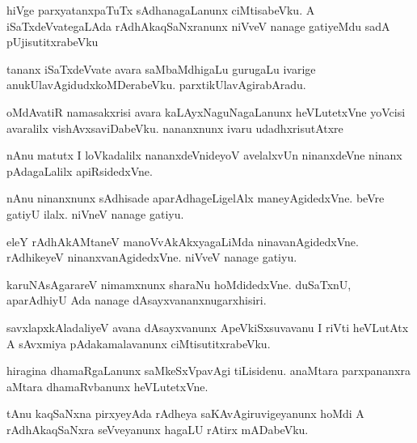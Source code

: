 \documentclass{article}
\begin{document}
\begin{mn}%
hiVge parxyatanxpaTuTx sAdhanagaLanunx ciMtisabeVku. A iSaTxdeVvategaLAda 
rAdhAkaqSaNxranunx niVveV nanage gatiyeMdu sadA pUjisutitxrabeVku
\end{mn}

\begin{mn}%
tananx iSaTxdeVvate avara saMbaMdhigaLu gurugaLu ivarige anukUlavAgidudxkoMDerabeVku. 
parxtikUlavAgirabAradu.
\end{mn}

\begin{mn}%
oMdAvatiR namasakxrisi avara kaLAyxNaguNagaLanunx heVLutetxVne yoVcisi avaralilx 
vishAvxsaviDabeVku. nananxnunx ivaru udadhxrisutAtxre
\end{mn}

\begin{mn}%
nAnu matutx I loVkadalilx nananxdeVnideyoV avelalxvUn ninanxdeVne ninanx pAdagaLalilx 
apiRsidedxVne.
\end{mn}

\begin{mn}%
nAnu ninanxnunx sAdhisade aparAdhageLigelAlx maneyAgidedxVne. beVre gatiyU ilalx. niVneV 
nanage gatiyu.
\end{mn}

\begin{mn}%
eleY rAdhAkAMtaneV manoVvAkAkxyagaLiMda ninavanAgidedxVne. rAdhikeyeV ninanxvanAgidedxVne. 
niVveV nanage gatiyu.
\end{mn}

\begin{mn}%
karuNAsAgarareV nimamxnunx sharaNu hoMdidedxVne. duSaTxnU, aparAdhiyU Ada nanage 
dAsayxvananxnugarxhisiri.
\end{mn}

\begin{mn}%
savxlapxkAladaliyeV avana dAsayxvanunx ApeVkiSxsuvavanu I riVti heVLutAtx A sAvxmiya 
pAdakamalavanunx ciMtisutitxrabeVku.
\end{mn}

\begin{mn}%
hiragina dhamaRgaLanunx saMkeSxVpavAgi tiLisidenu. anaMtara parxpananxra aMtara 
dhamaRvbanunx heVLutetxVne.
\end{mn}

\begin{mn}%
tAnu kaqSaNxna pirxyeyAda rAdheya saKAvAgiruvigeyanunx hoMdi A rAdhAkaqSaNxra seVveyanunx 
hagaLU rAtirx mADabeVku.
\end{mn}
\end{document}
